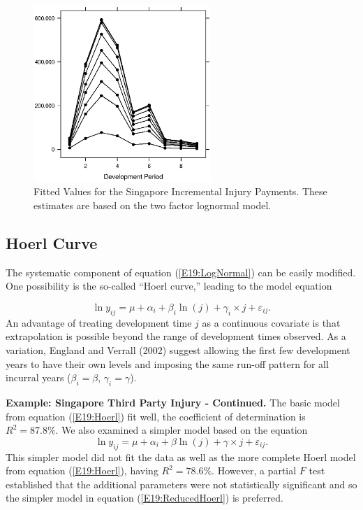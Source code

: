 \begin{figure}[htp]
    \includegraphics[width=0.6\textwidth]{Chapter19Triangles/F19PaymentFittedValues.eps}
  \caption{\label{F19:PaymentFittedValues} Fitted Values for the Singapore Incremental
Injury Payments. These estimates are based on the two factor
lognormal model.}
\end{figure}

\linejed

\subsection{Hoerl Curve}

The systematic component of equation (\ref{E19:LogNormal}) can be
easily modified. One possibility is the so-called ``Hoerl curve,''
leading to the model equation

\begin{equation}\label{E19:Hoerl}
\ln y_{ij} = \mu + \alpha_i + \beta_i \ln (j) + \gamma_i \times j +
\varepsilon_{ij} .
\end{equation}
An advantage of treating development time $j$ as a continuous
covariate is that extrapolation is possible beyond the range of
development times observed. As a variation, England and Verrall
(2002) suggest allowing the first few development years to have
their own levels and imposing the same run-off pattern for all
incurral years ($\beta_i = \beta$, $\gamma_i = \gamma$).

\linejed

\textbf{Example: Singapore Third Party Injury - Continued.} The
basic model from equation (\ref{E19:Hoerl}) fit well, the
coefficient of determination is $R^2 = 87.8 \%$. We also examined a
simpler model based on the equation
\begin{equation}\label{E19:ReducedHoerl}
\ln y_{ij} = \mu + \alpha_i +  \beta \ln (j) + \gamma \times j +
\varepsilon_{ij} .
\end{equation}
This simpler model did not fit the data as well as the more complete
Hoerl model from equation (\ref{E19:Hoerl}), having $R^2 = 78.6\%$.
However, a partial $F$ test established that the additional
parameters were not statistically significant and so the simpler
model in equation (\ref{E19:ReducedHoerl}) is preferred.

